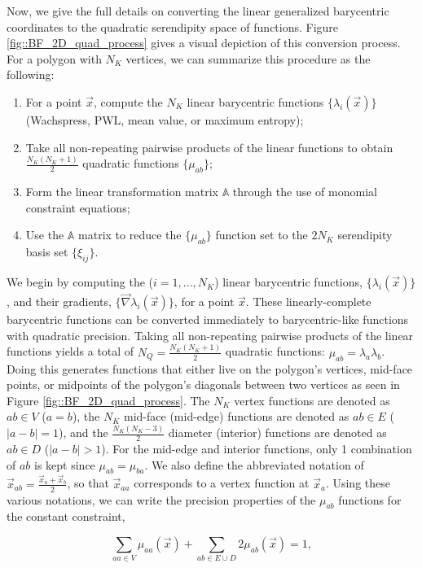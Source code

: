 \documentclass[preprint,10pt]{elsarticle}
\begin{document}
Now, we give the full details on converting the linear generalized barycentric coordinates to the quadratic serendipity space of functions. Figure \ref{fig::BF_2D_quad_process} gives a visual depiction of this conversion process. For a polygon with $N_K$ vertices, we can summarize this procedure as the following:

\begin{enumerate}
\item For a point $\vec{x}$, compute the $N_K$ linear barycentric functions $\{ \lambda_i (\vec{x}) \}$ (Wachspress, PWL, mean value, or maximum entropy);
\item Take all non-repeating pairwise products of the linear functions to obtain $\frac{N_K(N_K+1)}{2}$ quadratic functions $\{ \mu_{ab} \}$;
\item Form the linear transformation matrix $\mathbb{A}$ through the use of monomial constraint equations;
\item Use the $\mathbb{A}$ matrix to reduce the $\{ \mu_{ab} \}$ function set to the $2 N_K$ serendipity basis set $\{ \xi_{ij} \}$.
\end{enumerate}

We begin by computing the ($i=1,...,N_K$) linear barycentric functions, $\{ \lambda_i (\vec{x}) \}$, and their gradients, $\{ \vec{\nabla} \lambda_i (\vec{x}) \}$, for a point $\vec{x}$. These linearly-complete barycentric functions can be converted immediately to barycentric-like functions with quadratic precision. Taking all non-repeating pairwise products of the linear functions yields a total of $N_Q=\frac{N_K(N_K+1)}{2}$ quadratic functions: $\mu_{ab} = \lambda_a \lambda_b$. Doing this generates functions that either live on the polygon's vertices, mid-face points, or midpoints of the polygon's diagonals between two vertices as seen in Figure \ref{fig::BF_2D_quad_process}. The $N_K$ vertex functions are denoted as $ab \in V$ ($a=b$), the $N_K$ mid-face (mid-edge) functions are denoted as $ab \in E$ ($|a-b|=1$), and the $\frac{N_K(N_K-3)}{2}$ diameter (interior) functions are denoted as $ab \in D$ ($|a-b| > 1$). For the mid-edge and interior functions, only 1 combination of $ab$ is kept since $\mu_{ab}=\mu_{ba}$. We also define the abbreviated notation of $\vec{x}_{ab} = \frac{\vec{x}_a + \vec{x}_b}{2}$, so that $\vec{x}_{aa}$ corresponds to a vertex function at $\vec{x}_a$. Using these various notations, we can write the precision properties of the $\mu_{ab}$ functions for the constant constraint,

\begin{equation}
\label{eq::BF_quad_interp_req_constant_alt}
\sum_{aa \in V}  \mu_{aa} (\vec{x}) + \sum_{ab \in E \cup D} 2 \mu_{ab} (\vec{x})  = 1 ,
\end{equation}
\end{document}
